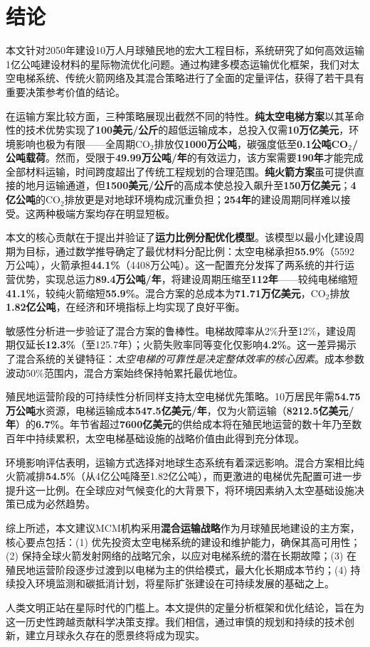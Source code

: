 \section{结论}

本文针对2050年建设10万人月球殖民地的宏大工程目标，系统研究了如何高效运输1亿公吨建设材料的星际物流优化问题。通过构建多模态运输优化框架，我们对太空电梯系统、传统火箭网络及其混合策略进行了全面的定量评估，获得了若干具有重要决策参考价值的结论。

在运输方案比较方面，三种策略展现出截然不同的特性。\textbf{纯太空电梯方案}以其革命性的技术优势实现了\textbf{100美元/公斤}的超低运输成本，总投入仅需\textbf{10万亿美元}，环境影响也极为有限——全周期CO$_2$排放仅\textbf{1000万公吨}，碳强度低至\textbf{0.1公吨CO$_2$/公吨载荷}。然而，受限于\textbf{49.99万公吨/年}的有效运力，该方案需要\textbf{190年}才能完成全部材料运输，时间跨度超出了传统工程规划的合理范围。\textbf{纯火箭方案}虽可提供直接的地月运输通道，但\textbf{1500美元/公斤}的高成本使总投入飙升至\textbf{150万亿美元}；\textbf{4亿公吨}的CO$_2$排放更是对地球环境构成沉重负担；\textbf{254年}的建设周期同样难以接受。这两种极端方案均存在明显短板。

本文的核心贡献在于提出并验证了\textbf{运力比例分配优化模型}。该模型以最小化建设周期为目标，通过数学推导确定了最优材料分配比例：太空电梯承担\textbf{55.9\%}（5592万公吨），火箭承担\textbf{44.1\%}（4408万公吨）。这一配置充分发挥了两系统的并行运营优势，实现总运力\textbf{89.4万公吨/年}，将建设周期压缩至\textbf{112年}——较纯电梯缩短\textbf{41.1\%}，较纯火箭缩短\textbf{55.9\%}。混合方案的总成本为\textbf{71.71万亿美元}，CO$_2$排放\textbf{1.82亿公吨}，在经济和环境指标上均实现了良好平衡。

敏感性分析进一步验证了混合方案的鲁棒性。电梯故障率从2\%升至12\%，建设周期仅延长\textbf{12.3\%}（至125.7年）；火箭失败率同等变化仅影响\textbf{4.2\%}。这一差异揭示了混合系统的关键特征：\textit{太空电梯的可靠性是决定整体效率的核心因素}。成本参数波动50\%范围内，混合方案始终保持帕累托最优地位。

殖民地运营阶段的可持续性分析同样支持太空电梯优先策略。10万居民年需\textbf{54.75万公吨}水资源，电梯运输成本\textbf{547.5亿美元/年}，仅为火箭运输（\textbf{8212.5亿美元/年}）的\textbf{6.7\%}。年节省超过\textbf{7600亿美元}的供给成本将在殖民地运营的数十年乃至数百年中持续累积，太空电梯基础设施的战略价值由此得到充分体现。

环境影响评估表明，运输方式选择对地球生态系统有着深远影响。混合方案相比纯火箭减排\textbf{54.5\%}（从4亿公吨降至1.82亿公吨），而更激进的电梯优先配置可进一步提升这一比例。在全球应对气候变化的大背景下，将环境因素纳入太空基础设施决策已成为必然趋势。

综上所述，本文建议MCM机构采用\textbf{混合运输战略}作为月球殖民地建设的主方案，核心要点包括：(1) 优先投资太空电梯系统的建设和维护能力，确保其高可用性；(2) 保持全球火箭发射网络的战略冗余，以应对电梯系统的潜在长期故障；(3) 在殖民地运营阶段逐步过渡到以电梯为主的供给模式，最大化长期成本节约；(4) 持续投入环境监测和碳抵消计划，将星际扩张建设在可持续发展的基础之上。

人类文明正站在星际时代的门槛上。本文提供的定量分析框架和优化结论，旨在为这一历史性跨越贡献科学决策支撑。我们相信，通过审慎的规划和持续的技术创新，建立月球永久存在的愿景终将成为现实。
